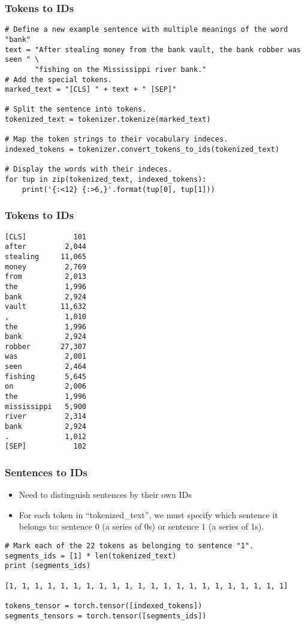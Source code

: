 \begin{frame}[fragile]\frametitle{Tokens to IDs}

\begin{lstlisting}
# Define a new example sentence with multiple meanings of the word "bank"
text = "After stealing money from the bank vault, the bank robber was seen " \
       "fishing on the Mississippi river bank."
# Add the special tokens.
marked_text = "[CLS] " + text + " [SEP]"

# Split the sentence into tokens.
tokenized_text = tokenizer.tokenize(marked_text)

# Map the token strings to their vocabulary indeces.
indexed_tokens = tokenizer.convert_tokens_to_ids(tokenized_text)

# Display the words with their indeces.
for tup in zip(tokenized_text, indexed_tokens):
    print('{:<12} {:>6,}'.format(tup[0], tup[1]))

\end{lstlisting}

\end{frame}

\begin{frame}[fragile]\frametitle{Tokens to IDs}

\begin{lstlisting}
[CLS]           101
after         2,044
stealing     11,065
money         2,769
from          2,013
the           1,996
bank          2,924
vault        11,632
,             1,010
the           1,996
bank          2,924
robber       27,307
was           2,001
seen          2,464
fishing       5,645
on            2,006
the           1,996
mississippi   5,900
river         2,314
bank          2,924
.             1,012
[SEP]           102
\end{lstlisting}

\end{frame}

\begin{frame}[fragile]\frametitle{Sentences to IDs}
\begin{itemize}
\item Need to distinguish sentences by their own IDs
\item For each token in ``tokenized\_text'', we must specify which sentence it belongs to: sentence 0 (a series of 0s) or sentence 1 (a series of 1s). 
\end{itemize}

\begin{lstlisting}
# Mark each of the 22 tokens as belonging to sentence "1".
segments_ids = [1] * len(tokenized_text)
print (segments_ids)

[1, 1, 1, 1, 1, 1, 1, 1, 1, 1, 1, 1, 1, 1, 1, 1, 1, 1, 1, 1, 1, 1]

tokens_tensor = torch.tensor([indexed_tokens])
segments_tensors = torch.tensor([segments_ids])
\end{lstlisting}

\end{frame}

